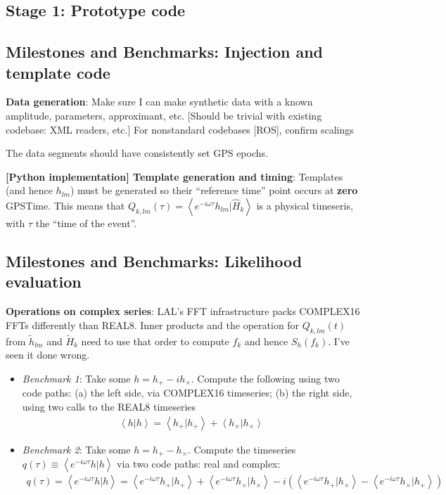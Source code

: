 \documentclass[twocolumn,prd,nofootinbib]{revtex4}
\newcommand\qmstateproduct[2]{\left\langle#1|#2\right\rangle}
\begin{document}
\begin{widetext}
\section{Stage 1: Prototype code}
\subsection{Milestones and Benchmarks: Injection and template code }
\noindent \textbf{Data generation}: Make sure I can make synthetic data with a known amplitude, parameters, approximant, etc.  [Should be trivial with
  existing codebase: XML readers, etc.] For nonstandard codebases [ROS], confirm scalings

The data segments should have consistently set GPS epochs.


\noindent \textbf{[Python implementation] Template generation and timing}: Templates (and hence $h_{lm}$) must be
generated so their ``reference time'' point occurs at \textbf{zero} GPSTime.  This means that $Q_{k,lm}(\tau) = \qmstateproduct{e^{-i\omega \tau}h_{lm}}{\hat{H}_k}$ is a
physical timeseris, with $\tau$ the ``time of the event''.  
%


\subsection{Milestones and Benchmarks: Likelihood evaluation}

\noindent \textbf{Operations on complex series}: LAL's FFT infrastructure packs COMPLEX16 FFTs differently than REAL8.
Inner products and the operation for $Q_{k,lm}(t)$ from $\tilde{h}_{lm}$ and $\tilde{H}_k$ need to use that order to
compute $f_k$ and hence $S_h(f_k)$.  I've seen it done wrong.
\begin{itemize}
\item  \emph{Benchmark 1}: Take some $h=h_+-ih_\times$.  Compute the following using two code paths: (a) the left side,
  via COMPLEX16 timeseries; (b) the right side, using two calls to the REAL8 timeseries
\begin{eqnarray}
\qmstateproduct{h}{h}=\qmstateproduct{h_+}{h_+}+\qmstateproduct{h_\times}{h_\times}
\end{eqnarray}
\item \emph{Benchmark 2}: Take some $h=h_+-h_\times$.  Compute the timeseries $q(\tau)\equiv \qmstateproduct{e^{-i\omega
    \tau}h}{h}$ via two code paths: real and complex:
\begin{eqnarray}
q(\tau) = \qmstateproduct{e^{-i\omega \tau} h}{h} = 
\qmstateproduct{e^{-i\omega \tau}h_+}{h_+} + \qmstateproduct{e^{-i\omega \tau}h_\times}{h_\times}
-i(\qmstateproduct{e^{-i\omega \tau}h_+}{h_\times} - \qmstateproduct{e^{-i\omega \tau}h_\times}{h_+})
\end{eqnarray}
\end{itemize}


\end{widetext}
\end{document}
